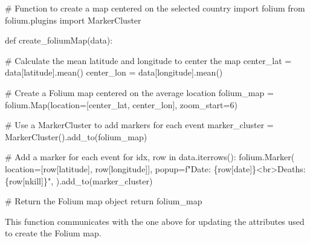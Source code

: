 \documentclass[
  letterpaper,
  DIV=11,
  numbers=noendperiod]{scrreprt}
\newenvironment{Shaded}{\begin{snugshade}}{\end{snugshade}}
\newcommand{\CommentTok}[1]{\textcolor[rgb]{0.37,0.37,0.37}{#1}}
\newcommand{\ControlFlowTok}[1]{\textcolor[rgb]{0.00,0.23,0.31}{#1}}
\newcommand{\DecValTok}[1]{\textcolor[rgb]{0.68,0.00,0.00}{#1}}
\newcommand{\ImportTok}[1]{\textcolor[rgb]{0.00,0.46,0.62}{#1}}
\newcommand{\KeywordTok}[1]{\textcolor[rgb]{0.00,0.23,0.31}{#1}}
\newcommand{\NormalTok}[1]{\textcolor[rgb]{0.00,0.23,0.31}{#1}}
\newcommand{\OperatorTok}[1]{\textcolor[rgb]{0.37,0.37,0.37}{#1}}
\newcommand{\SpecialCharTok}[1]{\textcolor[rgb]{0.37,0.37,0.37}{#1}}
\newcommand{\SpecialStringTok}[1]{\textcolor[rgb]{0.13,0.47,0.30}{#1}}
\newcommand{\StringTok}[1]{\textcolor[rgb]{0.13,0.47,0.30}{#1}}
\begin{document}
\begin{Shaded}
\begin{Highlighting}[]
\CommentTok{\# Function to create a map centered on the selected country}
\ImportTok{import}\NormalTok{ folium}
\ImportTok{from}\NormalTok{ folium.plugins }\ImportTok{import}\NormalTok{ MarkerCluster}

\KeywordTok{def}\NormalTok{ create\_foliumMap(data):}

    \CommentTok{\# Calculate the mean latitude and longitude to center the map}
\NormalTok{    center\_lat }\OperatorTok{=}\NormalTok{ data[}\StringTok{\textquotesingle{}latitude\textquotesingle{}}\NormalTok{].mean()}
\NormalTok{    center\_lon }\OperatorTok{=}\NormalTok{ data[}\StringTok{\textquotesingle{}longitude\textquotesingle{}}\NormalTok{].mean()}

    \CommentTok{\# Create a Folium map centered on the average location}
\NormalTok{    folium\_map }\OperatorTok{=}\NormalTok{ folium.Map(location}\OperatorTok{=}\NormalTok{[center\_lat, center\_lon], zoom\_start}\OperatorTok{=}\DecValTok{6}\NormalTok{)}

    \CommentTok{\# Use a MarkerCluster to add markers for each event}
\NormalTok{    marker\_cluster }\OperatorTok{=}\NormalTok{ MarkerCluster().add\_to(folium\_map)}

    \CommentTok{\# Add a marker for each event}
    \ControlFlowTok{for}\NormalTok{ idx, row }\KeywordTok{in}\NormalTok{ data.iterrows():}
\NormalTok{        folium.Marker(}
\NormalTok{            location}\OperatorTok{=}\NormalTok{[row[}\StringTok{\textquotesingle{}latitude\textquotesingle{}}\NormalTok{], row[}\StringTok{\textquotesingle{}longitude\textquotesingle{}}\NormalTok{]],}
\NormalTok{            popup}\OperatorTok{=}\SpecialStringTok{f"Date: }\SpecialCharTok{\{}\NormalTok{row[}\StringTok{\textquotesingle{}date\textquotesingle{}}\NormalTok{]}\SpecialCharTok{\}}\SpecialStringTok{\textless{}br\textgreater{}Deaths: }\SpecialCharTok{\{}\NormalTok{row[}\StringTok{\textquotesingle{}nkill\textquotesingle{}}\NormalTok{]}\SpecialCharTok{\}}\SpecialStringTok{"}\NormalTok{,}
\NormalTok{        ).add\_to(marker\_cluster)}

    \CommentTok{\# Return the Folium map object}
    \ControlFlowTok{return}\NormalTok{ folium\_map}
\end{Highlighting}
\end{Shaded}

This function communicates with the one above for updating the
attributes used to create the Folium map.
\end{document}
